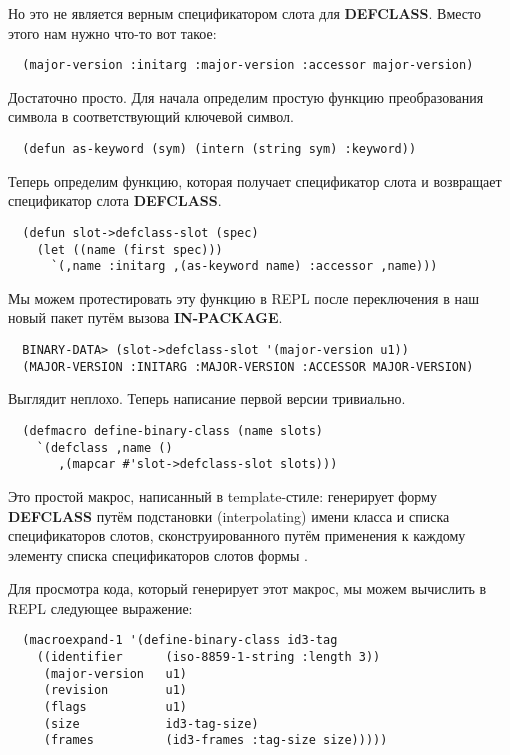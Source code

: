 Но это не является верным спецификатором слота для \textbf{DEFCLASS}. Вместо этого нам
нужно что-то вот такое:

\begin{lstlisting}
  (major-version :initarg :major-version :accessor major-version)
\end{lstlisting}

Достаточно просто. Для начала определим простую функцию преобразования символа в
соответствующий ключевой символ.

\begin{lstlisting}
  (defun as-keyword (sym) (intern (string sym) :keyword))
\end{lstlisting}

Теперь определим функцию, которая получает спецификатор слота  и возвращает спецификатор слота \textbf{DEFCLASS}.

\begin{lstlisting}
  (defun slot->defclass-slot (spec)
    (let ((name (first spec)))
      `(,name :initarg ,(as-keyword name) :accessor ,name)))
\end{lstlisting}

Мы можем протестировать эту функцию в REPL после переключения в наш новый пакет путём
вызова \textbf{IN-PACKAGE}.

\begin{verbatim}
  BINARY-DATA> (slot->defclass-slot '(major-version u1))
  (MAJOR-VERSION :INITARG :MAJOR-VERSION :ACCESSOR MAJOR-VERSION)
\end{verbatim}

Выглядит неплохо. Теперь написание первой версии  тривиально.

\begin{lstlisting}
  (defmacro define-binary-class (name slots)
    `(defclass ,name ()
       ,(mapcar #'slot->defclass-slot slots)))
\end{lstlisting}

Это простой макрос, написанный в template-стиле:  генерирует
форму \textbf{DEFCLASS} путём подстановки (interpolating) имени класса и списка
спецификаторов слотов, сконструированного путём применения  к
каждому элементу списка спецификаторов слотов формы .

Для просмотра кода, который генерирует этот макрос, мы можем вычислить в REPL следующее
выражение:

\begin{lstlisting}
  (macroexpand-1 '(define-binary-class id3-tag
    ((identifier      (iso-8859-1-string :length 3))
     (major-version   u1)
     (revision        u1)
     (flags           u1)
     (size            id3-tag-size)
     (frames          (id3-frames :tag-size size)))))
\end{lstlisting}

